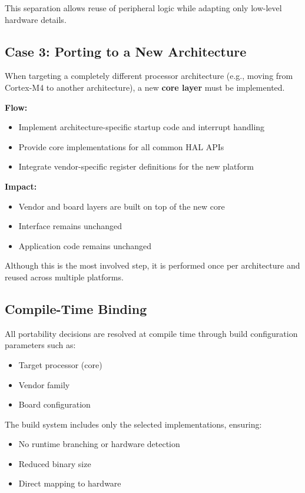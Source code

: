 This separation allows reuse of peripheral logic while adapting only low-level hardware details.

\subsection*{Case 3: Porting to a New Architecture}

When targeting a completely different processor architecture (e.g., moving from Cortex-M4 to another architecture), a new \textbf{core layer} must be implemented.

\textbf{Flow:}
\begin{itemize}
    \item Implement architecture-specific startup code and interrupt handling
    \item Provide core implementations for all common HAL APIs
    \item Integrate vendor-specific register definitions for the new platform
\end{itemize}

\textbf{Impact:}
\begin{itemize}
    \item Vendor and board layers are built on top of the new core
    \item Interface remains unchanged
    \item Application code remains unchanged
\end{itemize}

Although this is the most involved step, it is performed once per architecture and reused across multiple platforms.

\subsection*{Compile-Time Binding}

All portability decisions are resolved at compile time through build configuration parameters such as:

\begin{itemize}
    \item Target processor (core)
    \item Vendor family
    \item Board configuration
\end{itemize}

The build system includes only the selected implementations, ensuring:

\begin{itemize}
    \item No runtime branching or hardware detection
    \item Reduced binary size
    \item Direct mapping to hardware
\end{itemize}

